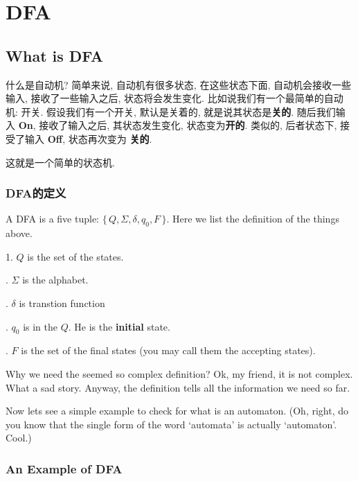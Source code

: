 \documentclass[../main_part1.tex]{subfiles}
\begin{document}
\section{DFA}
\label{sec:DFA}

\subsection{What is DFA}

什么是自动机? 简单来说, 自动机有很多状态, 在这些状态下面, 自动机会接收一些输入, 接收了一些输入之后, 状态将会发生变化. 比如说我们有一个最简单的自动机: 开关. 假设我们有一个开关, 默认是关着的, 就是说其状态是\textbf{关的}.
随后我们输入 \textbf{On}, 接收了输入之后, 其状态发生变化, 状态变为\textbf{开的}. 类似的, 后者状态下, 接受了输入 \textbf{Off}, 状态再次变为 \textbf{关的}.

这就是一个简单的状态机. 

\subsubsection{DFA的定义}

A DFA is a five tuple: \( \{ \, Q, \Sigma ,\delta , q _{0} , F \, \}\). Here we list the definition of the things above. 

\medskip%
{\setlength{\parindent}{10pt}
1. \(Q \) is the set of the states.

. \(\Sigma\) is the alphabet.

. \( \delta\) is transtion function

. \(q_0\)  is in the \(Q\). He is the \textbf{initial} state.

. \(F\) is the set of the final states (you may call them the accepting states). }

\medskip
Why we need the seemed so complex definition? Ok, my friend, it is not complex. What a sad story. Anyway, the definition tells all the
information we need so far.

\smallskip
Now lets see a simple example to check for what is an automaton. 
(Oh, right, do you know that the single form of the word `automata' is actually `automaton'. Cool.)


\subsubsection{An Example of DFA}
\end{document}
